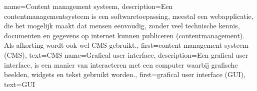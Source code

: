 \makenoidxglossaries

{
    name={Content management systeem},
    description={Een contentmanagementsysteem is een softwaretoepassing,
        meestal een webapplicatie, die het mogelijk maakt dat mensen eenvoudig, zonder veel technische kennis,
        documenten en gegevens op internet kunnen publiceren (contentmanagement).
    Als afkorting wordt ook wel CMS gebruikt.},
    first={content management systeem (CMS)},
    text={CMS}
}
{
    name={Grafical user interface},
    description={Een grafical user interface, is een manier van interacteren met een computer waarbij grafische beelden, widgets en tekst gebruikt worden.},
    first={grafical user interface (GUI)},
    text={GUI}
}
